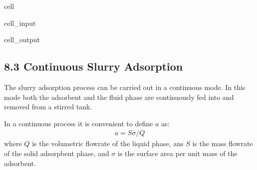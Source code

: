 \documentclass[letterpaper,10pt,english]{jupyterBook}
\begin{document}
\begin{sphinxuseclass}{cell}
\begin{sphinxVerbatimInput}
\begin{sphinxuseclass}{cell_input}
\begin{sphinxVerbatim}[commandchars=\\\{\}]
 
 
\PYG{p}{[}\PYG{p}{]} 
\end{sphinxVerbatim}

\end{sphinxuseclass}\end{sphinxVerbatimInput}
\begin{sphinxVerbatimOutput}

\begin{sphinxuseclass}{cell_output}
\noindent{}

\end{sphinxuseclass}\end{sphinxVerbatimOutput}

\end{sphinxuseclass}

\subsection{8.3 Continuous Slurry Adsorption}
\label{\detokenize{Slurry_Adsorption:continuous-slurry-adsorption}}
\sphinxAtStartPar
The slurry adsorption process can be carried out in a continuous mode. In this mode both the adsorbent and the fluid phase are continuously fed into and removed from a stirred tank.

\sphinxAtStartPar
In a continuous process it is convenient to define \(a\) as:
\begin{equation}\label{equation:Slurry_Adsorption:slurryeq13}
\begin{split}
a={S}\sigma/Q
\end{split}
\end{equation}
\sphinxAtStartPar
where \(Q\) is the volumetric flowrate of the liquid phase, ans \(S\) is the mass flowrate of the solid adsorpbent phase, and \(\sigma\) is the surface area per unit mass of the adsorbent.
\end{document}
